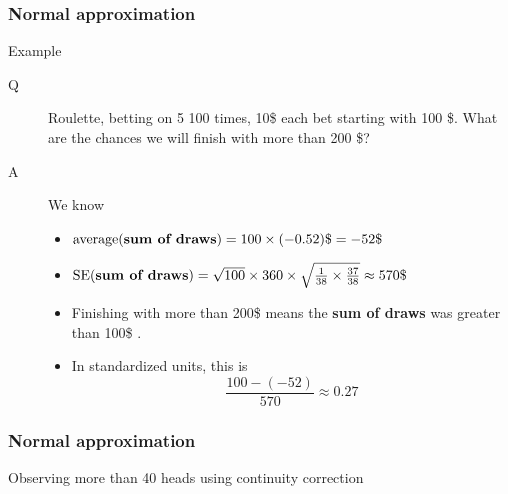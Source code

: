 \documentclass[handout]{beamer}
\begin{document}
   \begin{frame} \frametitle{Normal approximation}

   \begin{block}
   {Example}
   \begin{description}
   \item[Q] Roulette, betting on {\color{red} 5} 100 times, 10\$ each bet starting with 100 \$.
     What are the chances we will finish with more than 200 \$?
   \item[A] We know
     \begin{itemize}
     \item $\text{average({\bf sum of draws})} = 100 \times (-0.52)\$ = -52\$ $
     \item $\text{SE({\bf sum of draws})} = \sqrt{100} \times 360 \times \sqrt{\frac{1}{38} \times \frac{37}{38}} \approx 570\$ $
     \item Finishing with more than 200\$ means the {\bf sum of draws} was greater than 100\$ .
       \item In standardized units, this is
       $$
       \frac{100-(-52)}{570} \approx 0.27
       $$
     \end{itemize}
   \end{description}
   \end{block}
   \end{frame}



   \begin{frame}
   \frametitle{Normal approximation}
   \begin{center}
   \end{center}
   Observing more than 40 heads using continuity correction
   \end{frame}
\end{document}
